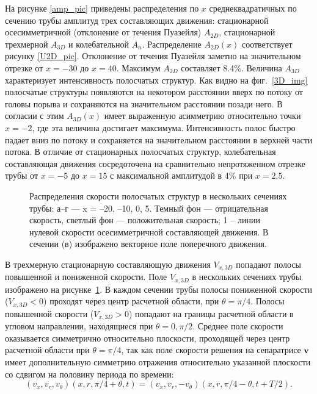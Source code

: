 На рисунке \ref{amp_pic} приведены распределения по $x$ среднеквадратичных по сечению трубы амплитуд трех составляющих движения: стационарной осесимметричной (отклонение от течения Пуазейля) $A_{2D}$, стационарной трехмерной $A_{3D}$ и колебательной $A_n$. Распределение $A_{2D}(x)$ соответствует рисунку \ref{U2D_pic}. Отклонение от течения Пуазейля заметно на значительном отрезке от $x=-30$ до $x=40$. Максимум $A_{2D}$ составляет 8.4\%. Величина $A_{3D}$ характеризует интенсивность полосчатых структур. Как видно на фиг.~\ref{3D_img} полосчатые структуры появляются на некотором расстоянии вверх по потоку от головы порыва и сохраняются на значительном расстоянии позади него. В согласии с этим $A_{3D}(x)$ имеет выраженную асимметрию относительно точки $x=-2$, где эта величина достигает максимума. Интенсивность полос быстро падает вниз по потоку и сохраняется на значительном расстоянии в верхней части потока. В отличие от стационарных полосчатых структур, колебательная составляющая движения сосредоточена на сравнительно непротяженном отрезке трубы от $x=-5$ до $x=15$ с максимальной амплитудой в 4\% при $x=2.5$.


\begin{figure}[h]
\caption{Распределения скорости полосчатых структур в нескольких сечениях трубы:
а–г --- x = –20, –10, 0, 5. Темный фон --- отрицательная скорость, светлый фон --- положительная скорость; 1 – линии нулевой скорости осесимметричной составляющей движения. В сечении (в) изображено векторное поле поперечного движения.}
\label{V3D_cs_pic}
\end{figure}


В трехмерную стационарную составляющую движения $V_{x,3D}$ попадают полосы повышенной и пониженной скорости. Поле $V_{x,3D}$ в нескольких сечениях трубы изображено на рисунке~\ref{V3D_cs_pic}. В каждом сечении трубы полосы пониженной скорости ($V_{x,3D} < 0$) проходят через центр расчетной области, при $\theta = \pi/4$. Полосы повышенной скорости ($V_{x,3D} > 0$) попадают на границы расчетной области в угловом направлении, находящиеся при $\theta = 0, \pi/2$. Среднее поле скорости оказывается симметрично относительно плоскости, проходящей через центр расчетной области при $\theta = \pi/4$, так как поле скорости решения на сепаратрисе $\mathbf{v}$ имеет дополнительную симметрию отражения относительно указанной плоскости со сдвигом на половину периода по времени:
\begin{equation}
(v_x, v_r, v_\theta)(x, r, \pi/4 + \theta, t) = (v_x, v_r, -v_\theta)(x, r, \pi/4 - \theta, t + T/2). 
\end{equation} 


